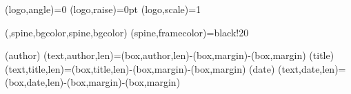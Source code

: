 (logo,angle)={0}
(logo,raise)={0pt}
(logo,scale)={1}

({,spine,bgcolor},{spine,bgcolor})%
                {}%
                {(spine,framecolor)={black!20}}

(author){%
  \spine(text,author,len)={\dimexpr\thespine(box,author,len)-\thespine(box,margin)-\thespine(box,margin)}
}{}
(title){%
  \spine(text,title,len)={\dimexpr\thespine(box,title,len)-\thespine(box,margin)-\thespine(box,margin)}
}{}
(date){%
  \spine(text,date,len)={\dimexpr\thespine(box,date,len)-\thespine(box,margin)-\thespine(box,margin)}
}{}


\newcommand{\@spinetextalin}[1]{%
  \raggedright%
  \IfStrEqCase{\thespine(box,#1,align)}{%
    {l}{\raggedright}%
    {c}{\centering}%
    {r}{\raggedleft}%
  }%
}

\newcommand{\@spinetextcolor}[1]{%
  \datamatchtf{\arg}{spine}({box,#1,textcolor},{box,textcolor}){\color{\arg}}{}%
}

